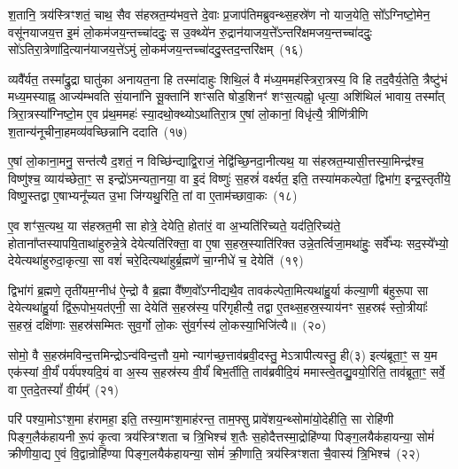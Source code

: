 श॒तानि॒ त्रय॑स्त्रिꣳशतं॒ चाथ॒ सैव स॑हस्रत॒म्य॑भव॒त्ते दे॒वाः प्र॒जा\-प॑तिमब्रुवन्थ्स॒हस्रे॑ण नो याज॒येति॒ सो᳚\-ऽग्निष्टो॒मेन॒ वसू॑नयाजय॒त्त इ॒मं लो॒कम॑जय॒न्तच्चा॑ददुः॒ स उ॒क्थ्ये॑न रु॒द्रान॑याजय॒त्ते᳚\-ऽन्तरि॑क्षमजय॒न्तच्चा॑ददुः॒ सो॑\-ऽतिरा॒त्रेणा॑\-दि॒त्यान॑याजय॒त्ते॑\-ऽमुं लो॒कम॑जय॒न्तच्चा॑ददु॒स्तद॒न्तरि॑क्षम्~(१६)

व्यवै᳚र्यत॒ तस्मा᳚द्रु॒द्रा घातु॑का अनायत॒ना हि तस्मा॑दाहुः शिथि॒लं वै म॑ध्य॒ममह॑स्त्रिरा॒त्रस्य॒ वि हि तद॒वैर्य॒तेति॒ त्रैष्टु॑भं मध्य॒मस्याह्न॒ आज्य॑म्भवति सं॒याना॑नि सू॒क्तानि॑ शꣳसति षोड॒शिनꣳ॑ शꣳस॒त्यह्नो॒ धृत्या॒ अशि॑थिलं भावाय॒ तस्मा᳚त् त्रिरा॒त्रस्या᳚ग्निष्टो॒म ए॒व प्र॑थ॒ममहः॑ स्या॒दथो॒क्थ्यो\-ऽथा॑तिरा॒त्र ए॒षां लो॒कानां॒ विधृ॑त्यै॒ त्रीणि॑त्रीणि श॒तान्य॑नूचीना॒हमव्य॑वच्छिन्नानि ददाति~(१७)

ए॒षां लो॒काना॒मनु॒ सन्त॑त्यै द॒शतं॒ न विच्छि॑न्द्याद्वि॒राजं॒ नेद्वि॑च्छि॒नदा॒नीत्यथ॒ या स॑हस्रत॒म्यासी॒त्तस्या॒मिन्द्र॑श्च॒ विष्णु॑श्च॒ व्याय॑च्छेता॒ꣳ॒ स इन्द्रो॑\-ऽमन्यता॒नया॒ वा इ॒दं विष्णुः॑ स॒हस्रं॑ वर्क्ष्यत॒ इति॒ तस्या॑मकल्पेतां॒ द्विभा॑ग॒ इन्द्र॒स्तृती॑ये॒ विष्णु॒स्तद्वा ए॒षाभ्यनू᳚च्यत उ॒भा जि॑ग्यथु॒रिति॒ तां वा ए॒ताम॑च्छावा॒कः~(१८)

ए॒व शꣳ॑स॒त्यथ॒ या स॑हस्रत॒मी सा होत्रे॒ देयेति॒ होता॑रं॒ वा अ॒भ्यति॑रिच्यते॒ यद॑ति॒रिच्य॑ते॒ होताना᳚प्तस्यापयि॒ता\-था॑हुरुन्ने॒त्रे देयेत्यति॑रिक्ता॒ वा ए॒षा स॒हस्र॒स्याति॑रिक्त उन्ने॒तर्त्विजा॒मथा॑हुः॒ सर्वे᳚भ्यः सद॒स्ये᳚भ्यो॒ देयेत्यथा॑हुरुदा॒कृत्या॒ सा वशं॑ चरे॒दित्यथा॑हुर्ब्र॒ह्मणे॑ चा॒ग्नीधे॑ च॒ देयेति॑~(१९)

द्विभा॑गं ब्र॒ह्मणे॒ तृती॑यम॒ग्नीध॑ ऐ॒न्द्रो वै ब्र॒ह्मा वै᳚ष्ण॒वो᳚\-ऽग्नीद्यथै॒व तावक॑ल्पेता॒मित्यथा॑हु॒र्या क॑ल्या॒णी ब॑हुरू॒पा सा देयेत्यथा॑हु॒र्या द्वि॑रू॒पोभ॒यत॑एनी॒ सा देयेति॑ स॒हस्र॑स्य॒ परि॑गृहीत्यै॒ तद्वा ए॒तथ्स॒हस्र॒स्याय॑नꣳ स॒हस्रꣴ॑ स्तो॒त्रीयाः᳚ स॒हस्रं॒ दक्षि॑णाः स॒हस्र॑सम्मितः सुव॒र्गो लो॒कः सु॑व॒र्गस्य॑ लो॒कस्या॒भिजि॑त्यै॥~(२०)

{\anuvakamend[{अ॒ब्र॒वी॒च्च॒ तद॒न्तरि॑क्षन्ददात्यच्छावा॒कश्च॒ देयेति॑ स॒प्तच॑त्वारिꣳशच्च}]}%

सोमो॒ वै स॒हस्र॑मविन्द॒त्तमिन्द्रो\-ऽन्व॑विन्द॒त्तौ य॒मो न्याग॑च्छ॒त्ताव॑ब्रवी॒दस्तु॒ मे\-ऽत्रापीत्यस्तु॒ ही(३) इत्य॑ब्रूता॒ꣳ॒ स य॒म एक॑स्यां वी॒र्यं॑ पर्य॑पश्यदि॒यं वा अ॒स्य स॒हस्र॑स्य वी॒र्यं॑ बिभ॒र्तीति॒ ताव॑ब्रवीदि॒यं ममास्त्वे॒तद्यु॒वयो॒रिति॒ ताव॑ब्रूता॒ꣳ॒ सर्वे॒ वा ए॒तदे॒तस्यां᳚ वी॒र्यम्᳚~(२१)

परि॑ पश्या॒मो\-ऽꣳश॒मा ह॑रामहा॒ इति॒ तस्या॒मꣳश॒माह॑रन्त॒ ताम॒फ्सु प्रावे॑शय॒न्थ्सोमा॑यो॒देहीति॒ सा रोहि॑णी पिङ्ग॒लैक॑हायनी रू॒पं कृ॒त्वा त्रय॑स्त्रिꣳशता च त्रि॒भिश्च॑ श॒तैः स॒होदैत्तस्मा॒द्रोहि॑ण्या पिङ्ग॒लयैक॑हायन्या॒ सोमं॑ क्रीणीया॒द्य ए॒वं वि॒द्वान्रोहि॑ण्या पिङ्ग॒लयैक॑हायन्या॒ सोमं॑ क्री॒णाति॒ त्रय॑स्त्रिꣳशता चै॒वास्य॑ त्रि॒भिश्च॑~(२२)

